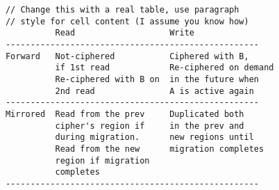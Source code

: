\begin{table}[t]
    \begin{center}
        \scriptsize
        \centering
        \begin{verbatim}
            // Change this with a real table, use paragraph
            // style for cell content (I assume you know how)
                      Read                   Write
            ---------------------------------------------------
            Forward   Not-ciphered           Ciphered with B,
                      if 1st read            Re-ciphered on demand
                      Re-ciphered with B on  in the future when
                      2nd read               A is active again
            ---------------------------------------------------
            Mirrored  Read from the prev     Duplicated both
                      cipher's region if     in the prev and
                      during migration.      new regions until
                      Read from the new      migration completes
                      region if migration
                      completes
            ---------------------------------------------------
        \end{verbatim}
    \end{center}

\end{table}

